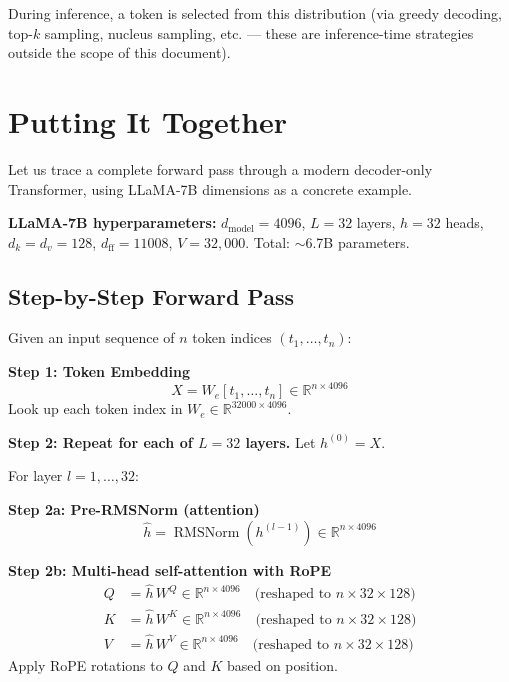 \documentclass[11pt,a4paper]{article}
\newcommand{\R}{\mathbb{R}}
\newcommand{\RMSNorm}{\operatorname{RMSNorm}}
\newcommand{\dmodel}{d_{\text{model}}}
\newcommand{\dff}{d_{\text{ff}}}
\newcommand{\dk}{d_k}
\newcommand{\dv}{d_v}
\begin{document}
During inference, a token is selected from this distribution (via greedy decoding, top-$k$
sampling, nucleus sampling, etc. --- these are inference-time strategies outside the scope
of this document).


\section{Putting It Together}
\label{sec:full-forward-pass}

Let us trace a complete forward pass through a modern decoder-only Transformer, using
LLaMA-7B dimensions \cite{touvron2023} as a concrete example.

\begin{dimbox}
\textbf{LLaMA-7B hyperparameters:}
$\dmodel = 4096$, $L = 32$ layers, $h = 32$ heads, $\dk = \dv = 128$,
$\dff = 11008$, $V = 32{,}000$. Total: $\sim$6.7B parameters.
\end{dimbox}

\subsection{Step-by-Step Forward Pass}

Given an input sequence of $n$ token indices $(t_1, \ldots, t_n)$:

\medskip

\noindent\textbf{Step 1: Token Embedding}
\begin{equation}
  X = W_e[t_1, \ldots, t_n] \in \R^{n \times 4096}
\end{equation}
Look up each token index in $W_e \in \R^{32000 \times 4096}$.

\medskip

\noindent\textbf{Step 2: Repeat for each of $L = 32$ layers.} Let $h^{(0)} = X$.

For layer $l = 1, \ldots, 32$:

\medskip

\noindent\textbf{Step 2a: Pre-RMSNorm (attention)}
\begin{equation}
  \hat{h} = \RMSNorm(h^{(l-1)}) \in \R^{n \times 4096}
\end{equation}

\noindent\textbf{Step 2b: Multi-head self-attention with RoPE}
\begin{align}
  Q &= \hat{h} \, W^Q \in \R^{n \times 4096} \quad \text{(reshaped to $n \times 32 \times 128$)} \\
  K &= \hat{h} \, W^K \in \R^{n \times 4096} \quad \text{(reshaped to $n \times 32 \times 128$)} \\
  V &= \hat{h} \, W^V \in \R^{n \times 4096} \quad \text{(reshaped to $n \times 32 \times 128$)}
\end{align}
Apply RoPE rotations to $Q$ and $K$ based on position.
\end{document}
